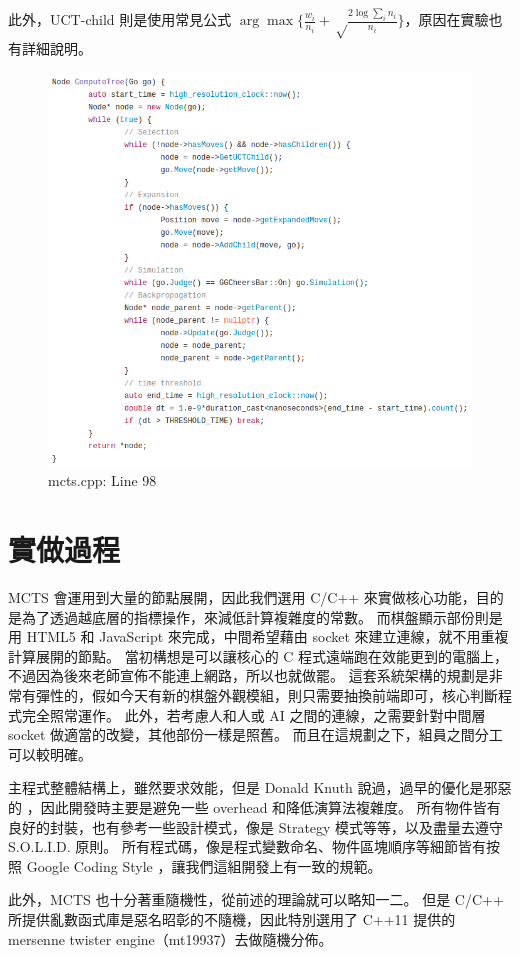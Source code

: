 \documentclass[12pt]{article}
\begin{document}
\begin{CJK}{UTF8}{bsmi}
此外，UCT-child 則是使用常見公式 $\arg\max\{\frac{w_i}{n_i}+\sqrt\frac{2\log\sum_i{n_i}}{n_i}\}$，原因在實驗也有詳細說明。

\begin{figure}[h]
  \caption{mcts.cpp: Line 98}
  \centering
  \includegraphics[width=.8\textwidth]{tree}
\end{figure}

\section{實做過程}
MCTS 會運用到大量的節點展開，因此我們選用 C/C++ 來實做核心功能，目的是為了透過越底層的指標操作，來減低計算複雜度的常數。
而棋盤顯示部份則是用 HTML5 和 JavaScript 來完成，中間希望藉由 socket 來建立連線，就不用重複計算展開的節點。
當初構想是可以讓核心的 C 程式遠端跑在效能更到的電腦上，不過因為後來老師宣佈不能連上網路，所以也就做罷。
這套系統架構的規劃是非常有彈性的，假如今天有新的棋盤外觀模組，則只需要抽換前端即可，核心判斷程式完全照常運作。
此外，若考慮人和人或 AI 之間的連線，之需要針對中間層 socket 做適當的改變，其他部份一樣是照舊。
而且在這規劃之下，組員之間分工可以較明確。

主程式整體結構上，雖然要求效能，但是 Donald Knuth 說過，過早的優化是邪惡的 \cite{Knuth}，因此開發時主要是避免一些 overhead 和降低演算法複雜度。
所有物件皆有良好的封裝，也有參考一些設計模式，像是 Strategy 模式等等，以及盡量去遵守 S.O.L.I.D. 原則。
所有程式碼，像是程式變數命名、物件區塊順序等細節皆有按照 Google Coding Style \cite{gcs}，讓我們這組開發上有一致的規範。

此外，MCTS 也十分著重隨機性，從前述的理論就可以略知一二。
但是 C/C++ 所提供亂數函式庫是惡名昭彰的不隨機，因此特別選用了 C++11 提供的 mersenne twister engine（mt19937）去做隨機分佈。


\end{CJK}
\end{document}
